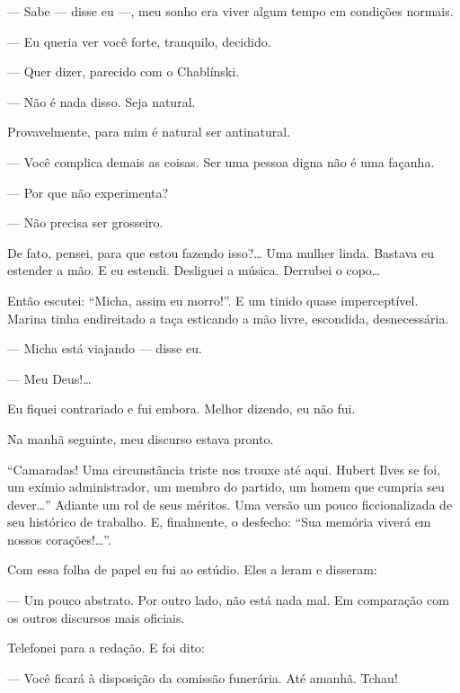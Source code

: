 --- Sabe --- disse eu ---, meu sonho era viver algum tempo em condições
normais.

--- Eu queria ver você forte, tranquilo, decidido.

--- Quer dizer, parecido com o Chablínski.

--- Não é nada disso. Seja natural.

Provavelmente, para mim é natural ser antinatural.

--- Você complica demais as coisas. Ser uma pessoa digna não é uma
façanha.

--- Por que não experimenta?

--- Não precisa ser grosseiro.

De fato, pensei, para que estou fazendo isso?\ldots{} Uma mulher linda.
Bastava eu estender a mão. E eu estendi. Desliguei a música. Derrubei o
copo\ldots{}

Então escutei: ``Micha, assim eu morro!''. E um tinido quase
imperceptível. Marina tinha endireitado a taça esticando a mão livre,
escondida, desnecessária.

--- Micha está viajando --- disse eu.

--- Meu Deus!\ldots{}

Eu fiquei contrariado e fui embora. Melhor dizendo, eu não fui.

Na manhã seguinte, meu discurso estava pronto.

``Camaradas! Uma circunstância triste nos trouxe até aqui. Hubert Ilves
se foi, um exímio administrador, um membro do partido, um homem que
cumpria seu dever\ldots{}'' Adiante um rol de seus méritos. Uma versão um
pouco ficcionalizada de seu histórico de trabalho. E, finalmente, o
desfecho: ``Sua memória viverá em nossos corações!\ldots{}''.

Com essa folha de papel eu fui ao estúdio. Eles a leram e disseram:

--- Um pouco abstrato. Por outro lado, não está nada mal. Em comparação
com os outros discursos mais oficiais.

Telefonei para a redação. E foi dito:

--- Você ficará à disposição da comissão funerária. Até amanhã. Tchau!

